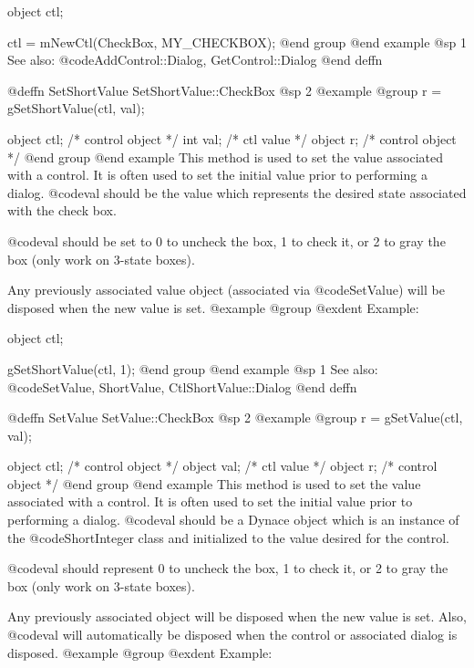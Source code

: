 object  ctl;

ctl = mNewCtl(CheckBox, MY_CHECKBOX);
@end group
@end example
@sp 1
See also:  @code{AddControl::Dialog, GetControl::Dialog}
@end deffn







@deffn {SetShortValue} SetShortValue::CheckBox
@sp 2
@example
@group
r = gSetShortValue(ctl, val);

object  ctl;    /*  control object  */
int     val;    /*  ctl value       */
object  r;      /*  control object  */
@end group
@end example
This method is used to set the value associated with a control.  It is
often used to set the initial value prior to performing a dialog.
@code{val} should be the value which represents the desired state associated
with the check box.

@code{val} should be set to 0 to uncheck the box, 1 to check it, or 2 to
gray the box (only work on 3-state boxes).

Any previously associated value object (associated via @code{SetValue})
will be disposed when the new value is set.
@example
@group
@exdent Example:

object  ctl;

gSetShortValue(ctl, 1);
@end group
@end example
@sp 1
See also:  @code{SetValue, ShortValue, CtlShortValue::Dialog}
@end deffn
















@deffn {SetValue} SetValue::CheckBox
@sp 2
@example
@group
r = gSetValue(ctl, val);

object  ctl;    /*  control object  */
object  val;    /*  ctl value       */
object  r;      /*  control object  */
@end group
@end example
This method is used to set the value associated with a control.  It is
often used to set the initial value prior to performing a dialog.
@code{val} should be a Dynace object which is an instance of the
@code{ShortInteger} class and initialized to the value desired for the
control.

@code{val} should represent 0 to uncheck the box, 1 to check it, or 2 to
gray the box (only work on 3-state boxes).

Any previously associated object will be disposed when the new value is set.
Also, @code{val} will automatically be disposed when the control or associated
dialog is disposed.
@example
@group
@exdent Example:

